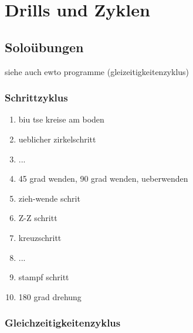 

\renewcommand\chapterillustration{pushing_minimalistisch}
\chapter{Drills und Zyklen}


\section{Solo\"ubungen}

siehe auch ewto programme (gleizeitigkeitenzyklus)



\subsection{Schrittzyklus}

\begin{enumerate}
	\item biu tse kreise am boden
	\item ueblicher zirkelschritt
	\item ...
	\item 45 grad wenden, 90 grad wenden, ueberwenden
	\item zieh-wende schrit
	\item Z-Z schritt
	\item kreuzschritt
	\item ...
	\item stampf schritt
	\item 180 grad drehung
\end{enumerate}

\subsection{Gleichzeitigkeitenzyklus}

